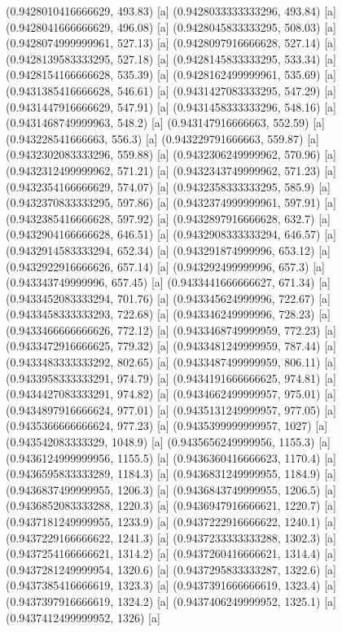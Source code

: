 {{{(0.9428010416666629, 493.83) [a] 
(0.9428033333333296, 493.84) [a] 
(0.9428041666666629, 496.08) [a] 
(0.9428045833333295, 508.03) [a] 
(0.9428074999999961, 527.13) [a] 
(0.9428097916666628, 527.14) [a] 
(0.9428139583333295, 527.18) [a] 
(0.9428145833333295, 533.34) [a] 
(0.9428154166666628, 535.39) [a] 
(0.9428162499999961, 535.69) [a] 
(0.9431385416666628, 546.61) [a] 
(0.9431427083333295, 547.29) [a] 
(0.9431447916666629, 547.91) [a] 
(0.9431458333333296, 548.16) [a] 
(0.9431468749999963, 548.2) [a] 
(0.943147916666663, 552.59) [a] 
(0.943228541666663, 556.3) [a] 
(0.943229791666663, 559.87) [a] 
(0.9432302083333296, 559.88) [a] 
(0.9432306249999962, 570.96) [a] 
(0.9432312499999962, 571.21) [a] 
(0.9432343749999962, 571.23) [a] 
(0.9432354166666629, 574.07) [a] 
(0.9432358333333295, 585.9) [a] 
(0.9432370833333295, 597.86) [a] 
(0.9432374999999961, 597.91) [a] 
(0.9432385416666628, 597.92) [a] 
(0.9432897916666628, 632.7) [a] 
(0.9432904166666628, 646.51) [a] 
(0.9432908333333294, 646.57) [a] 
(0.9432914583333294, 652.34) [a] 
(0.943291874999996, 653.12) [a] 
(0.9432922916666626, 657.14) [a] 
(0.943292499999996, 657.3) [a] 
(0.943343749999996, 657.45) [a] 
(0.9433441666666627, 671.34) [a] 
(0.9433452083333294, 701.76) [a] 
(0.943345624999996, 722.67) [a] 
(0.9433458333333293, 722.68) [a] 
(0.943346249999996, 728.23) [a] 
(0.9433466666666626, 772.12) [a] 
(0.9433468749999959, 772.23) [a] 
(0.9433472916666625, 779.32) [a] 
(0.9433481249999959, 787.44) [a] 
(0.9433483333333292, 802.65) [a] 
(0.9433487499999959, 806.11) [a] 
(0.9433958333333291, 974.79) [a] 
(0.9434191666666625, 974.81) [a] 
(0.9434427083333291, 974.82) [a] 
(0.9434662499999957, 975.01) [a] 
(0.9434897916666624, 977.01) [a] 
(0.9435131249999957, 977.05) [a] 
(0.9435366666666624, 977.23) [a] 
(0.9435399999999957, 1027) [a] 
(0.943542083333329, 1048.9) [a] 
(0.9435656249999956, 1155.3) [a] 
(0.9436124999999956, 1155.5) [a] 
(0.9436360416666623, 1170.4) [a] 
(0.9436595833333289, 1184.3) [a] 
(0.9436831249999955, 1184.9) [a] 
(0.9436837499999955, 1206.3) [a] 
(0.9436843749999955, 1206.5) [a] 
(0.9436852083333288, 1220.3) [a] 
(0.9436947916666621, 1220.7) [a] 
(0.9437181249999955, 1233.9) [a] 
(0.9437222916666622, 1240.1) [a] 
(0.9437229166666622, 1241.3) [a] 
(0.9437233333333288, 1302.3) [a] 
(0.9437254166666621, 1314.2) [a] 
(0.9437260416666621, 1314.4) [a] 
(0.9437281249999954, 1320.6) [a] 
(0.9437295833333287, 1322.6) [a] 
(0.9437385416666619, 1323.3) [a] 
(0.9437391666666619, 1323.4) [a] 
(0.9437397916666619, 1324.2) [a] 
(0.9437406249999952, 1325.1) [a] 
(0.9437412499999952, 1326) [a] 
}}}
